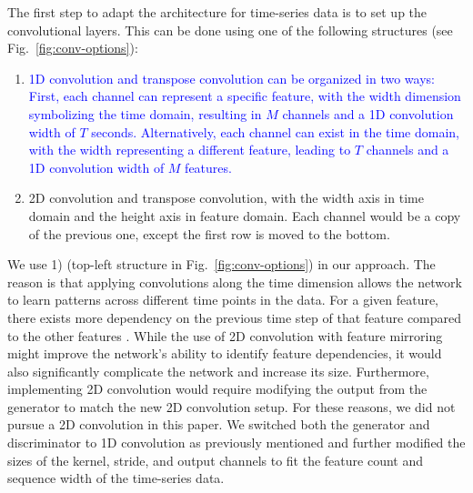 The first step to adapt the architecture for time-series data is to set up the convolutional layers. This can be done using one of the following structures (see Fig.~\ref{fig:conv-options}):
%
\begin{enumerate}
    \item \textcolor{blue}{ 1D convolution and transpose convolution can be organized in two ways: First, each channel can represent a specific feature, with the width dimension symbolizing the time domain, resulting in $M$ channels and a 1D convolution width of $T$ seconds. Alternatively, each channel can exist in the time domain, with the width representing a different feature, leading to $T$ channels and a 1D convolution width of $M$ features.}
    \item 2D convolution and transpose convolution, with the width axis in time domain and the height axis in feature domain. Each channel would be a copy of the previous one, except the first row is moved to the bottom.
\end{enumerate}
%
We use 1) (top-left structure in Fig.~\ref{fig:conv-options}) in our approach. The reason is that applying convolutions along the time dimension allows the network to learn patterns across different time points in the data. For a given feature, there exists more dependency on the previous time step of that feature compared to the other features \cite{Ismail_Fawaz_2019}.
%
While the use of 2D convolution with feature mirroring might improve the network's ability to identify feature dependencies, it would also significantly complicate the network and increase its size. Furthermore, implementing 2D convolution would require modifying the output from the generator to match the new 2D convolution setup. For these reasons, we did not pursue a 2D convolution in this paper.
%
We switched both the generator and discriminator to 1D convolution as previously mentioned and further modified the sizes of the kernel, stride, and output channels to fit the feature count and sequence width of the time-series data. 

